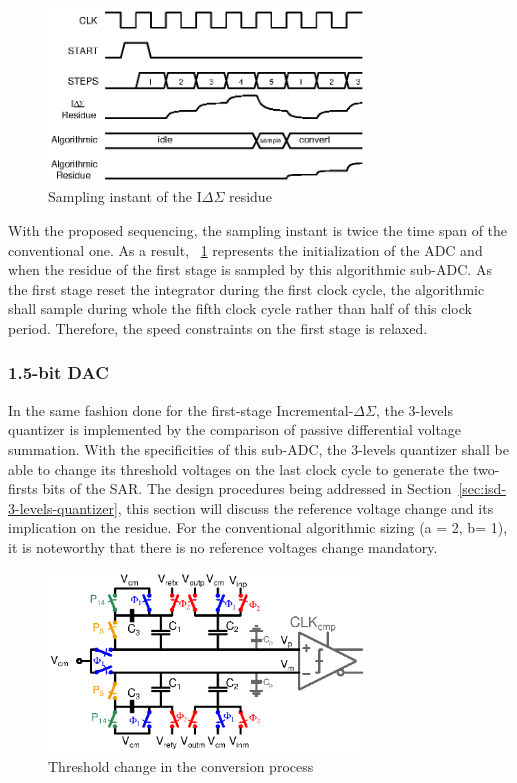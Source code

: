 \begin{figure}[htp]
	\centering
	\includegraphics[width=0.75\textwidth]{Chapter4/Figs/isd-algo-residue-sampling.ps}
	\caption{Sampling instant of the I\(\Delta \Sigma \) residue}
	\label{fig:digital-sampling}
\end{figure}

With the proposed sequencing, the sampling instant is twice the time span of the conventional one. As a result, \figurename~\ref{fig:digital-sampling} represents the initialization of the ADC and when the residue of the first stage is sampled by this algorithmic sub-ADC\@. As the first stage reset the integrator during the first clock cycle, the algorithmic shall sample during whole the fifth clock cycle rather than half of this clock period. Therefore, the speed constraints on the first stage is relaxed.

	\subsubsection{1.5-bit DAC}             %
In the same fashion done for the first-stage Incremental-\(\Delta\Sigma \), the 3-levels quantizer is implemented by the comparison of passive differential voltage summation. With the specificities of this sub-ADC, the 3-levels quantizer shall be able to change its threshold voltages on the last clock cycle to generate the two-firsts bits of the SAR\@. The design procedures being addressed in Section~\ref{sec:isd-3-levels-quantizer}, this section will discuss the reference voltage change and its implication on the residue. For the conventional algorithmic sizing (a = 2, b= 1), it is noteworthy that there is no reference voltages change mandatory.

\begin{figure}[htp]
	\centering
	\includegraphics[width=0.75\textwidth]{Chapter4/Figs/algo-passive-adder-comp.ps}
	\caption{Threshold change in the conversion process}
	\label{fig:thresholds-generator}
\end{figure}

